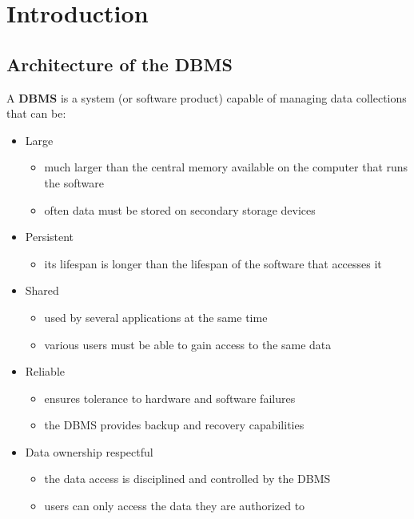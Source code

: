 \documentclass[english]{article}
\begin{document}

\section{Introduction}

\subsection{Architecture of the DBMS}

A \textbf{DBMS} is a system (or software product) capable of managing data collections that can be:

\begin{itemize}
  \item Large
        \begin{itemize}[label=\(\rightarrow\)]
          \item much larger than the central memory available on the computer that runs the software
          \item often data must be stored on secondary storage devices
        \end{itemize}
  \item Persistent
        \begin{itemize}[label=\(\rightarrow\)]
          \item its lifespan is longer than the lifespan of the software that accesses it
        \end{itemize}
  \item Shared
        \begin{itemize}[label=\(\rightarrow\)]
          \item used by several applications at the same time
          \item various users must be able to gain access to the same data
        \end{itemize}
  \item Reliable
        \begin{itemize}[label=\(\rightarrow\)]
          \item ensures tolerance to hardware and software failures
          \item the DBMS provides backup and recovery capabilities
        \end{itemize}
  \item Data ownership respectful
        \begin{itemize}[label=\(\rightarrow\)]
          \item the data access is disciplined and controlled by the DBMS
          \item users can only access the data they are authorized to
        \end{itemize}
\end{itemize}
\end{document}
